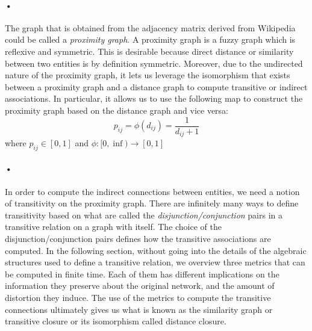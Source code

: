 \documentclass[12pt]{article}
\begin{document}
\paragraph{•}
The graph that is obtained from the adjacency matrix derived from Wikipedia could be called a \textit{proximity graph}. A proximity graph is a fuzzy graph which is reflexive and symmetric. This is desirable because direct distance or similarity between two entities is by definition symmetric. Moreover, due to the undirected nature of the proximity graph, it lets us leverage the isomorphism that exists between a proximity graph and a distance graph to compute transitive or indirect associations. In particular, it allows us to use the following map to construct the proximity graph based on the distance graph and vice versa:$$p_{ij} = \phi(d_{ij}) = \frac{1}{d_{ij}+1}$$ where $p_{ij} \in [0,1] $ and $\phi:[0,\inf) \rightarrow [0,1]$

\paragraph{•}
In order to compute the indirect connections between entities, we need a notion of transitivity on the proximity graph. There are infinitely many ways to define transitivity based on what are called the \textit{disjunction/conjunction} pairs in a transitive relation on a graph with itself. The choice of the disjunction/conjunction pairs defines how the transitive associations are computed. In the following section, without going into the details of the algebraic structures used to define a transitive relation, we overview three metrics that can be computed in finite time. Each of them has different implications on the information they preserve about the original network, and the amount of distortion they induce. The use of the metrics to compute the transitive connections ultimately gives us what is known as the similarity graph or transitive closure or its isomorphism called distance closure.
\end{document}
